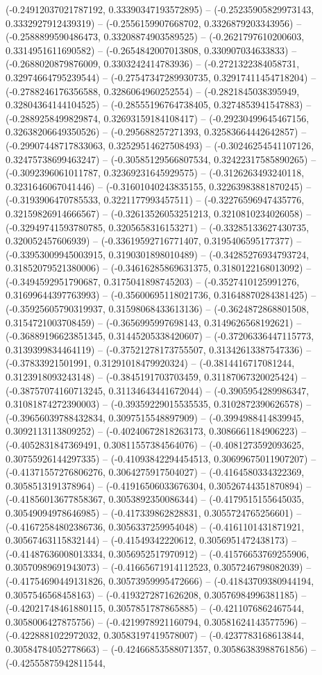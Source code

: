 (-0.24912037021787192, 0.33390347193572895) -- (-0.25235905829973143, 0.3332927912439319) -- (-0.2556159907668702, 0.3326879203343956) -- (-0.2588899590486473, 0.33208874903589525) -- (-0.2621797610200603, 0.3314951611690582) -- (-0.2654842007013808, 0.330907034633833) -- (-0.2688020879876009, 0.3303242414783936) -- (-0.2721322384058731, 0.32974664795239544) -- (-0.27547347289930735, 0.32917411454718204) -- (-0.2788246176356588, 0.3286064960252554) -- (-0.2821845038395949, 0.32804364144104525) -- (-0.28555196764738405, 0.3274853941547883) -- (-0.2889258499829874, 0.32693159184108417) -- (-0.29230499645467156, 0.32638206649350526) -- (-0.295688257271393, 0.32583664442642857) -- (-0.29907448717833063, 0.32529514627508493) -- (-0.30246254541107126, 0.32475738699463247) -- (-0.30585129566807534, 0.32422317585890265) -- (-0.3092396061011787, 0.32369231645929575) -- (-0.3126263493240118, 0.3231646067041446) -- (-0.31601040243835155, 0.32263983881870245) -- (-0.3193906470785533, 0.3221177993457511) -- (-0.32276596947435776, 0.32159826914666567) -- (-0.32613526053251213, 0.3210810234026058) -- (-0.32949741593780785, 0.3205658316153271) -- (-0.33285133627430735, 0.320052457606939) -- (-0.33619592716771407, 0.3195406595177377) -- (-0.33953009945003915, 0.3190301898010489) -- (-0.34285276934793724, 0.31852079521380006) -- (-0.34616285869631375, 0.3180122168013092) -- (-0.3494592951790687, 0.3175041898745203) -- (-0.3527410125991276, 0.31699644397763993) -- (-0.35600695118021736, 0.31648870284381425) -- (-0.35925605790319937, 0.31598068433613136) -- (-0.3624872868801508, 0.3154721003708459) -- (-0.3656995997698143, 0.3149626568192621) -- (-0.36889196623851345, 0.31445205338420607) -- (-0.37206336447115773, 0.3139399834464119) -- (-0.37521278173755507, 0.31342613387547336) -- (-0.37833921501991, 0.31291018479920324) -- (-0.3814416717081244, 0.3123918093243148) -- (-0.3845191703703459, 0.31187067320025424) -- (-0.38757074160713245, 0.31134643441672044) -- (-0.3905954289986347, 0.31081874272390003) -- (-0.39359229015535535, 0.3102872390626578) -- (-0.39656039788432834, 0.3097515548897909) -- (-0.3994988414839945, 0.3092113113809252) -- (-0.40240672818263173, 0.3086661184906223) -- (-0.4052831847369491, 0.30811557384564076) -- (-0.4081273592093625, 0.30755926144297335) -- (-0.41093842294454513, 0.30699675011907207) -- (-0.41371557276806276, 0.3064275917504027) -- (-0.4164580334322369, 0.3058513191378964) -- (-0.41916506033676304, 0.30526744351870894) -- (-0.41856013677858367, 0.3053892350086344) -- (-0.4179515155645035, 0.30549094978646985) -- (-0.417339862828831, 0.3055724765256601) -- (-0.41672584802386736, 0.3056337259954048) -- (-0.4161101431871921, 0.30567463115832144) -- (-0.41549342220612, 0.3056951472438173) -- (-0.41487636008013334, 0.3056952517970912) -- (-0.41576653769255906, 0.30570989691943073) -- (-0.41665671914112523, 0.3057246798082039) -- (-0.41754690449131826, 0.30573959995472666) -- (-0.41843709380944194, 0.3057546568458163) -- (-0.4193272871626208, 0.30576984996381185) -- (-0.42021748461880115, 0.3057851787865885) -- (-0.4211076862467544, 0.3058006427875756) -- (-0.4219978921160794, 0.30581624143577596) -- (-0.4228881022972032, 0.30583197419578007) -- (-0.4237783168613844, 0.30584784052778663) -- (-0.42466853588071357, 0.30586383988761856) -- (-0.42555875942811544, 